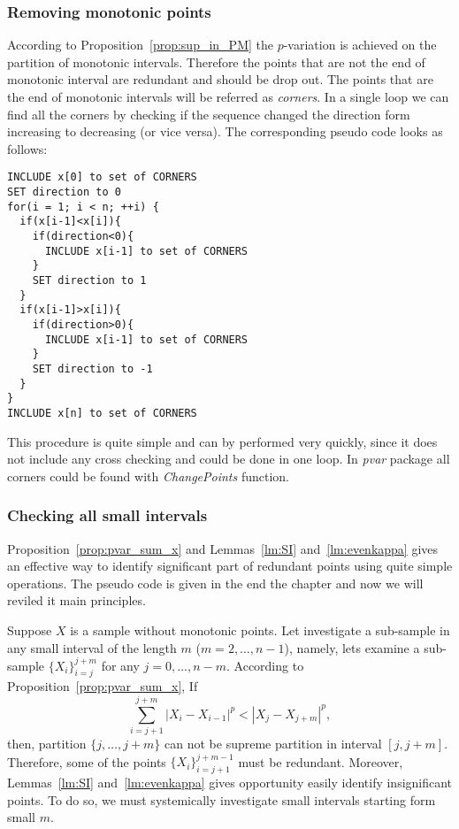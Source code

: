 \documentclass[12pt, a4paper]{article}
\numberwithin{equation}{section}
\begin{document}
\subsubsection{Removing monotonic points}

According to Proposition~\ref{prop:sup_in_PM}
the $p$-variation is achieved 
on the partition of monotonic intervals.
Therefore the points that are not 
the end of monotonic interval are redundant 
and should be drop out.
The points that are the end of monotonic intervals
will be referred as \emph{corners}. 
In a single loop we can 
find all the corners by checking if the sequence
changed the direction form increasing to decreasing
(or vice versa).
The corresponding pseudo code looks as follows:

\begin{lstlisting}
INCLUDE x[0] to set of CORNERS 
SET direction to 0 
for(i = 1; i < n; ++i) {
  if(x[i-1]<x[i]){
    if(direction<0){
      INCLUDE x[i-1] to set of CORNERS 
    }     
    SET direction to 1 
  }
  if(x[i-1]>x[i]){
    if(direction>0){
      INCLUDE x[i-1] to set of CORNERS 
    }     
    SET direction to -1 
  }        
}  
INCLUDE x[n] to set of CORNERS 
\end{lstlisting}

This procedure is quite simple and
 can by performed very quickly, since it does not include
any cross checking and could be done in one loop.
In \emph{pvar} package all corners could be found with \emph{ChangePoints} function.



\subsubsection{Checking all small intervals}
\label{sec:CheckSmallIntervals}

Proposition~\ref{prop:pvar_sum_x} and 
Lemmas~\ref{lm:SI} and~\ref{lm:evenkappa} gives an effective 
way to identify significant part of 
redundant points 
using quite simple operations. 
The pseudo code is given in the end the chapter and
now we will reviled it main principles.

Suppose $X$ is a sample without monotonic points. 
Let investigate a sub-sample in
any small interval of the length $m$ ($m=2,\dots,n-1$), 
namely, lets examine a sub-sample 
$\{X_{i}\}_{i=j}^{j+m}$
for any $j=0,...,n-m$.
According to Proposition~\ref{prop:pvar_sum_x},
If 
\begin{equation}\label{eq:dropsamll1}
  \sum_{i=j+1}^{j+m} |X_{i}-X_{i-1}|^p < |X_j-X_{j+m}|^p,
\end{equation}
then,
partition $\{j,\dots,j+m\}$ 
can not be supreme partition in interval
$[j,j+m]$. 
Therefore, some of the points $\{X_{i}\}_{i=j+1}^{j+m-1}$
must be redundant.
Moreover, Lemmas~\ref{lm:SI} and~\ref{lm:evenkappa} 
gives opportunity easily identify 
insignificant points. To do so, we must 
systemically investigate small intervals starting form
small $m$.
\end{document}
